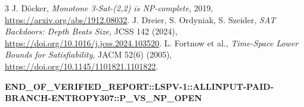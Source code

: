 \documentclass[11pt]{article}
\begin{document}
\begin{thebibliography}{3}
 J. D\"ocker, \emph{Monotone 3-Sat-(2,2) is NP-complete}, 2019, \url{https://arxiv.org/abs/1912.08032}.
 J. Dreier, S. Ordyniak, S. Szeider, \emph{SAT Backdoors: Depth Beats Size}, JCSS 142 (2024), \url{https://doi.org/10.1016/j.jcss.2024.103520}.
 L. Fortnow et al., \emph{Time-Space Lower Bounds for Satisfiability}, JACM 52(6) (2005), \url{https://doi.org/10.1145/1101821.1101822}.
\end{thebibliography}
\noindent\textbf{END\_OF\_VERIFIED\_REPORT::LSPV-1::ALLINPUT-PAID-BRANCH-ENTROPY307::P\_VS\_NP\_OPEN}
\end{document}
